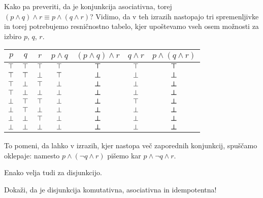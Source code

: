                 Kako pa preveriti, da je konjunkcija asociativna, torej $(p \land q) \land r \equiv p \land (q \land r)$? Vidimo, da v teh izrazih nastopajo tri spremenljivke in torej potrebujemo resničnostno tabelo, kjer upoštevamo vseh osem možnosti za izbiro $p$, $q$, $r$.

                \begin{center}
                        \begin{tabular}{ccc|cccc}
                                $p$ & $q$ & $r$ & $p \land q$ & $(p \land q) \land r$ & $q \land r$ & $p \land (q \land r)$ \\
                                \hline
                                $\top$ & $\top$ & $\top$ & $\top$ & $\bm{\top}$ & $\top$ & $\bm{\top}$ \\
                                $\top$ & $\top$ & $\bot$ & $\top$ & $\bm{\bot}$ & $\bot$ & $\bm{\bot}$ \\
                                $\top$ & $\bot$ & $\top$ & $\bot$ & $\bm{\bot}$ & $\bot$ & $\bm{\bot}$ \\
                                $\top$ & $\bot$ & $\bot$ & $\bot$ & $\bm{\bot}$ & $\bot$ & $\bm{\bot}$ \\
                                $\bot$ & $\top$ & $\top$ & $\bot$ & $\bm{\bot}$ & $\top$ & $\bm{\bot}$ \\
                                $\bot$ & $\top$ & $\bot$ & $\bot$ & $\bm{\bot}$ & $\bot$ & $\bm{\bot}$ \\
                                $\bot$ & $\bot$ & $\top$ & $\bot$ & $\bm{\bot}$ & $\bot$ & $\bm{\bot}$ \\
                                $\bot$ & $\bot$ & $\bot$ & $\bot$ & $\bm{\bot}$ & $\bot$ & $\bm{\bot}$
                        \end{tabular}
                \end{center}

                To pomeni, da lahko v izrazih, kjer nastopa več zaporednih konjunkcij, spuščamo oklepaje: namesto $p \land (\lnot{q} \land r)$ pišemo kar $p \land \lnot{q} \land r$.

                Enako velja tudi za disjunkcijo.

                \begin{vaja}
                        Dokaži, da je disjunkcija komutativna, asociativna in idempotentna!
                \end{vaja}

